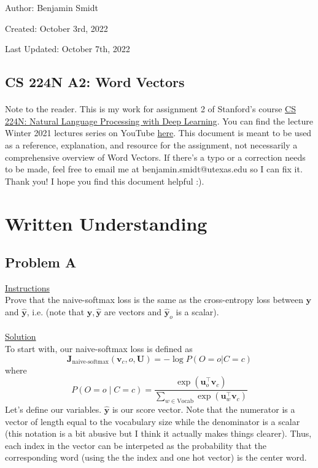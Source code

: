 \documentclass[12pt]{article}
\begin{document}
\noindent Author: Benjamin Smidt

\noindent Created: October 3rd, 2022

\noindent Last Updated: October 7th, 2022
\begin{center}
\section*{CS 224N A2: Word Vectors}
\end{center}

\paragraph{} Note to the reader. This is my work for assignment 2 of Stanford's course
\href{https://web.stanford.edu/class/cs224n/}{CS 224N: Natural Language Processing with Deep Learning}. 
You can find the lecture Winter 2021 lectures series on YouTube \href{https://www.youtube.com/playlist?list=PLoROMvodv4rOSH4v6133s9LFPRHjEmbmJ}{here}.
This document is meant to be used as a reference, explanation, and resource for the assignment, 
not necessarily a comprehensive overview of Word Vectors. If there's a typo or a correction 
needs to be made, feel free to email me at benjamin.smidt@utexas.edu so I can fix it. 
Thank you! I hope you find this document helpful :). 

\tableofcontents{}

\newpage

\section{Written Understanding}

\subsection{Problem A}
\underline{Instructions}
~\\
Prove that the naive-softmax loss is the same as the cross-entropy 
loss between $\bm y$ and $\hat{\bm y}$, i.e. (note that $\bm y, \hat{\bm y}$ 
are vectors and $\hat{\bm y}_o$ is a scalar).
~\\
~\\
\underline{Solution}
~\\
To start with, our naive-softmax loss is defined as
\begin{equation*}
    \bm J_{\text{naive-softmax}}(\bm v_c, o, \bm U) = -\log P(O=o| C=c)
\end{equation*}
where 
\begin{equation*}
P(O=o \mid C=c) = \frac{\exp(\bm u_{o}^\top \bm v_c)}{\sum_{w \in \text{Vocab}} \exp(\bm u_{w}^\top \bm v_c)}
\end{equation*}
Let's define our variables. $ \hat{\bm y}$ is our score vector. Note that the 
numerator is a vector of length equal to the vocabulary size while the denominator is a scalar (this notation 
is a bit abusive but I think it actually makes things clearer). Thus, each index 
in the vector can be interpeted as the probability that the corresponding word (using the 
the index and one hot vector) is the center word. 
\end{document}
